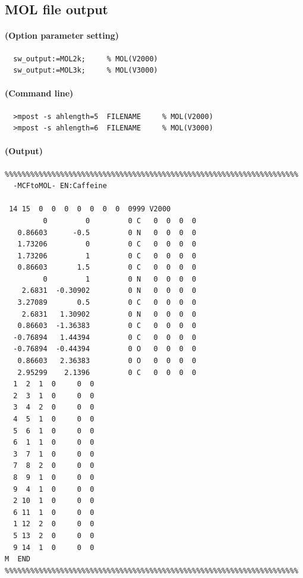 \documentclass[a4paper]{article}
\begin{document}
\subsection{MOL file output}
\paragraph{(Option parameter setting)}
%
%
%
\begin{verbatim}
  sw_output:=MOL2k;     % MOL(V2000)
  sw_output:=MOL3k;     % MOL(V3000)
\end{verbatim}
\paragraph{(Command line)}
\begin{verbatim}
  >mpost -s ahlength=5  FILENAME     % MOL(V2000)
  >mpost -s ahlength=6  FILENAME     % MOL(V3000)
\end{verbatim}
\paragraph{(Output)}
\begin{verbatim}
%%%%%%%%%%%%%%%%%%%%%%%%%%%%%%%%%%%%%%%%%%%%%%%%%%%%%%%%%%%%%%%%%%%%%
  -MCFtoMOL- EN:Caffeine         

 14 15  0  0  0  0  0  0  0  0999 V2000
         0         0         0 C   0  0  0  0
   0.86603      -0.5         0 N   0  0  0  0
   1.73206         0         0 C   0  0  0  0
   1.73206         1         0 C   0  0  0  0
   0.86603       1.5         0 C   0  0  0  0
         0         1         0 N   0  0  0  0
    2.6831  -0.30902         0 N   0  0  0  0
   3.27089       0.5         0 C   0  0  0  0
    2.6831   1.30902         0 N   0  0  0  0
   0.86603  -1.36383         0 C   0  0  0  0
  -0.76894   1.44394         0 C   0  0  0  0
  -0.76894  -0.44394         0 O   0  0  0  0
   0.86603   2.36383         0 O   0  0  0  0
   2.95299    2.1396         0 C   0  0  0  0
  1  2  1  0     0  0
  2  3  1  0     0  0
  3  4  2  0     0  0
  4  5  1  0     0  0
  5  6  1  0     0  0
  6  1  1  0     0  0
  3  7  1  0     0  0
  7  8  2  0     0  0
  8  9  1  0     0  0
  9  4  1  0     0  0
  2 10  1  0     0  0
  6 11  1  0     0  0
  1 12  2  0     0  0
  5 13  2  0     0  0
  9 14  1  0     0  0
M  END
%%%%%%%%%%%%%%%%%%%%%%%%%%%%%%%%%%%%%%%%%%%%%%%%%%%%%%%%%%%%%%%%%%%%%
\end{verbatim}%
\newpage
\end{document}
